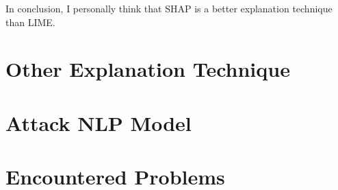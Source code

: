 \documentclass{article}[12pt]
\begin{document}
In conclusion, I personally think that SHAP is a better explanation technique than LIME.


\section{Other Explanation Technique}

\section{Attack NLP Model}

\section{Encountered Problems}
\end{document}
